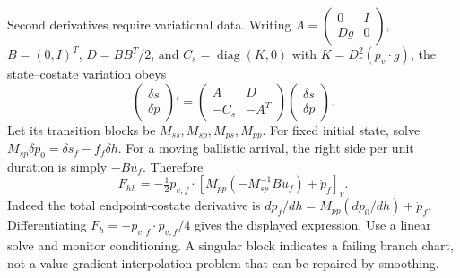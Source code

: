 Second derivatives require variational data. Writing
$A=\left(\begin{smallmatrix}0&I\\Dg&0\end{smallmatrix}\right)$,
$B=(0,I)^T$, $D=BB^T/2$, and
$C_s=\operatorname{diag}(K,0)$ with
$K=D_r^2(p_v\cdot g)$, the state--costate variation obeys
\begin{equation}
 \begin{pmatrix}\delta s\\\delta p\end{pmatrix}'
 =\begin{pmatrix}A&D\\-C_s&-A^T\end{pmatrix}
 \begin{pmatrix}\delta s\\\delta p\end{pmatrix}.
 \label{eq:variational}
\end{equation}
Let its transition blocks be $M_{ss},M_{sp},M_{ps},M_{pp}$.
For fixed initial state, solve
$M_{sp}\delta p_0=\delta s_f-f_f\delta h$.
For a moving ballistic arrival, the right side per unit duration
is simply $-Bu_f$. Therefore
\begin{equation}
 F_{hh}=-\tfrac12p_{v,f}\cdot
 \left[M_{pp}(-M_{sp}^{-1}Bu_f)+\dot p_f\right]_v.
\end{equation}
Indeed the total endpoint-costate derivative is
$dp_f/dh=M_{pp}(dp_0/dh)+\dot p_f$. Differentiating
$F_h=-p_{v,f}\cdot p_{v,f}/4$ gives the displayed expression.
Use a linear solve and monitor conditioning. A singular block indicates
a failing branch chart, not a value-gradient interpolation problem that
can be repaired by smoothing.

